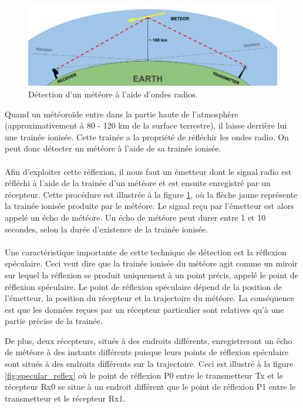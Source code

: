 \documentclass[11pt]{article}
\begin{document}
\begin{figure}[t]
    \begin{center}
        \includegraphics[scale=0.37]{ForwardScatter_principle.png}
        \caption{Détection d'un météore à l'aide d'ondes radios.}
        \label{fig:forward_scatt}
    \end{center}
\end{figure}

Quand un météoroïde entre dans la partie haute de l'atmosphère (approximativement à 80 - 120 km de la surface terrestre), il laisse derrière lui une trainée ionisée.
Cette trainée a la propriété de réfléchir les ondes radio.
On peut donc détecter un météore à l'aide de sa trainée ionisée.
\\
\\
Afin d'exploiter cette réflexion, il nous faut un émetteur dont le signal radio est réfléchi à l'aide de la trainée d'un météore et est ensuite enregistré par un récepteur.
Cette procédure est illustrée à la figure \ref{fig:forward_scatt}, où la flèche jaune représente la trainée ionisée produite par le météore.
Le signal reçu par l'émetteur est alors appelé un écho de météore.
Un écho de météore peut durer entre 1 et 10 secondes, selon la durée d'existence de la trainée ionisée.
\\
\\
Une caractéristique importante de cette technique de détection est la réflexion spéculaire.
Ceci veut dire que la trainée ionisée du météore agit comme un miroir sur lequel la réflexion se produit uniquement à un point précis, appelé le point de réflexion spéculaire.
Le point de réflexion spéculaire dépend de la position de l'émetteur, la position du récepteur et la trajectoire du météore.
La conséquence est que les données reçues par un récepteur particulier sont relatives qu'à une partie précise de la trainée.

\newpage

De plus, deux récepteurs, situés à des endroits différents, enregistreront un écho de météore à des instants différents puisque leurs points de réflexion spéculaire sont situés à des endroits différents sur la trajectoire.
Ceci est illustré à la figure \ref{fig:specular_reflex} où le point de réflexion P0 entre le transmetteur Tx et le récepteur Rx0 se situe à un endroit différent que le point de réflexion P1 entre le transmetteur et le récepteur Rx1.
\end{document}
